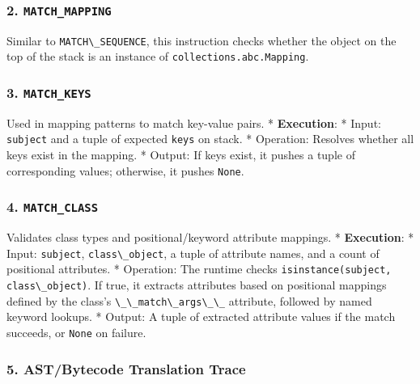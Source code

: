 \hypertarget{match_mapping}{%
\subsubsection{\texorpdfstring{2.
\texttt{MATCH\_MAPPING}}{2. MATCH\_MAPPING}}\label{match_mapping}}

Similar to \passthrough{\lstinline!MATCH\_SEQUENCE!}, this instruction
checks whether the object on the top of the stack is an instance of
\passthrough{\lstinline!collections.abc.Mapping!}.

\hypertarget{match_keys}{%
\subsubsection{\texorpdfstring{3.
\texttt{MATCH\_KEYS}}{3. MATCH\_KEYS}}\label{match_keys}}

Used in mapping patterns to match key-value pairs. * \textbf{Execution}:
* Input: \passthrough{\lstinline!subject!} and a tuple of expected
\passthrough{\lstinline!keys!} on stack. * Operation: Resolves whether
all keys exist in the mapping. * Output: If keys exist, it pushes a
tuple of corresponding values; otherwise, it pushes
\passthrough{\lstinline!None!}.

\hypertarget{match_class}{%
\subsubsection{\texorpdfstring{4.
\texttt{MATCH\_CLASS}}{4. MATCH\_CLASS}}\label{match_class}}

Validates class types and positional/keyword attribute mappings. *
\textbf{Execution}: * Input: \passthrough{\lstinline!subject!},
\passthrough{\lstinline!class\_object!}, a tuple of attribute names, and
a count of positional attributes. * Operation: The runtime checks
\passthrough{\lstinline!isinstance(subject, class\_object)!}. If true,
it extracts attributes based on positional mappings defined by the
class's \passthrough{\lstinline!\_\_match\_args\_\_!} attribute,
followed by named keyword lookups. * Output: A tuple of extracted
attribute values if the match succeeds, or
\passthrough{\lstinline!None!} on failure.

\hypertarget{astbytecode-translation-trace}{%
\subsubsection{5. AST/Bytecode Translation
Trace}\label{astbytecode-translation-trace}}

